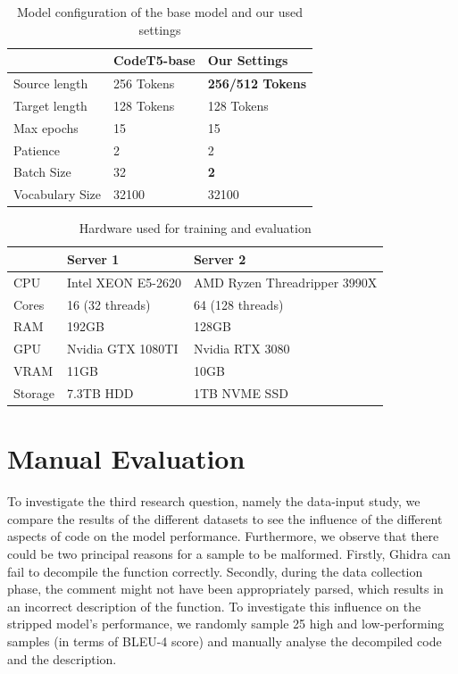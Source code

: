 \begin{table}[tbh]
\centering
\begin{tabular}{l|ll}
\hline
                & CodeT5-base & Our Settings            \\ \hline
Source length   & 256 Tokens  & \textbf{256/512 Tokens} \\
Target length   & 128 Tokens  & 128 Tokens              \\
Max epochs      & 15          & 15                      \\
Patience        & 2           & 2                       \\
Batch Size      & 32          & \textbf{2}              \\
Vocabulary Size & 32100       & 32100                  
\end{tabular}
\caption{Model configuration of the base model and our used settings}
\label{tab:modelSettings}
\end{table}

\begin{table}[tbh]
\centering
\begin{tabular}{l|ll}
\hline
        & Server 1           & Server 2                     \\ \hline
CPU     & Intel XEON E5-2620 & AMD Ryzen Threadripper 3990X \\
Cores   & 16 (32 threads)    & 64 (128 threads)             \\
RAM     & 192GB              & 128GB                        \\
GPU     & Nvidia GTX 1080TI  & Nvidia RTX 3080              \\
VRAM    & 11GB               & 10GB                         \\
Storage & 7.3TB HDD          & 1TB NVME SSD                
\end{tabular}
\caption{Hardware used for training and evaluation}
\label{tab:server}
\end{table}

\section{Manual Evaluation}
To investigate the third research question, namely the data-input study, we compare the results of the different datasets to see the influence of the different aspects of code on the model performance. Furthermore, we observe that there could be two principal reasons for a sample to be malformed. Firstly, Ghidra can fail to decompile the function correctly. Secondly, during the data collection phase, the comment might not have been appropriately parsed, which results in an incorrect description of the function. To investigate this influence on the stripped model's performance, we randomly sample 25 high and low-performing samples (in terms of BLEU-4 score) and manually analyse the decompiled code and the description. 

